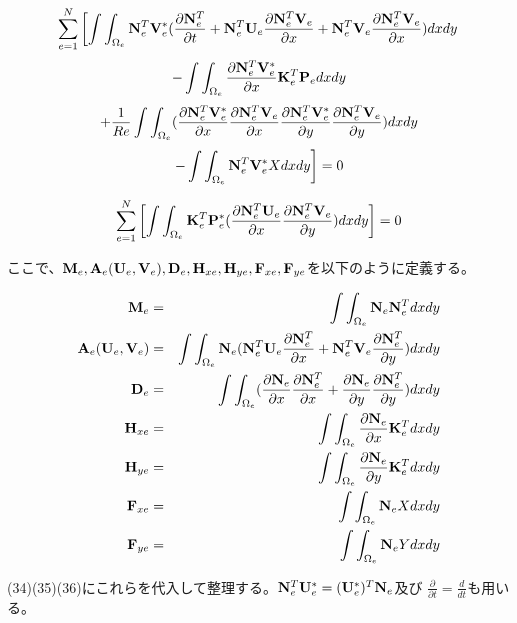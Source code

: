 \documentclass{jarticle}
\begin{document}
\[
\sum_{e=1}^N\left[ \int\int_{\Omega_e}{\bf N}_e^T{\bf V}_e^*(\frac{\partial{\bf N}_e^T}{\partial t}
  + {\bf N}_e^T{\bf U}_e\frac{\partial {\bf N}_e^T{\bf V}_e}{\partial x}
  + {\bf N}_e^T{\bf V}_e\frac{\partial {\bf N}_e^T{\bf V}_e}{\partial x})dxdy
\right.\]\[
- \int\int_{\Omega_e}\frac{\partial {\bf N}_e^T{\bf V}_e^*}{\partial x}{\bf K}_e^T {\bf P}_e dxdy
\]\[
+\frac{1}{Re}\int\int_{\Omega_e}(
\frac{\partial {\bf N}_e^T{\bf V}_e^*}{\partial x}\frac{\partial {\bf N}_e^T{\bf V}_e}{\partial x}
\frac{\partial {\bf N}_e^T{\bf V}_e^*}{\partial y}\frac{\partial {\bf N}_e^T{\bf V}_e}{\partial y}
)dxdy
\]\begin{equation}
\left.-\int\int_{\Omega_e}{\bf N}_e^T{\bf V}_e^* X dxdy \right] = 0
\end{equation}


\begin{equation}
  \sum_{e=1}^N\left[ \int\int_{\Omega_e}{\bf K}_e^T{\bf P}_e^*(
    \frac{\partial {\bf N}_e^T{\bf U}_e}{\partial x}
    \frac{\partial {\bf N}_e^T{\bf V}_e}{\partial y}
    )dxdy\right]=0
\end{equation}


ここで、${\bf M}_e, {\bf A}_e({\bf U}_e,{\bf V}_e), {\bf D}_e, {\bf H}_{xe}, {\bf H}_{ye}, {\bf F}_{xe}, {\bf F}_{ye}$を以下のように定義する。

\begin{eqnarray}
  {\bf M}_e&=&\int\int_{\Omega_e}{\bf N}_e{\bf N}_e^Tdxdy \\
  {\bf A}_e({\bf U}_e,{\bf V}_e) &=& \int\int_{\Omega_e}{\bf N}_e(
  {\bf N}_e^T{\bf U}_e\frac{\partial {\bf N}_e^T}{\partial x}
 + {\bf N}_e^T{\bf V}_e\frac{\partial {\bf N}_e^T}{\partial y}
  )dxdy\\
 {\bf D}_e&=&\int\int_{\Omega_e}(
 \frac{\partial{\bf N}_e}{\partial x}\frac{\partial{\bf N}_e^T}{\partial x}
+\frac{\partial{\bf N}_e}{\partial y}\frac{\partial{\bf N}_e^T}{\partial y}
 )dxdy\\
{\bf H}_{xe}&=&\int\int_{\Omega_e}\frac{\partial {\bf N}_e}{\partial x}{\bf K}_e^Tdxdy\\
{\bf H}_{ye}&=&\int\int_{\Omega_e}\frac{\partial {\bf N}_e}{\partial y}{\bf K}_e^Tdxdy\\
{\bf F}_{xe}&=&\int\int_{\Omega_e}{\bf N}_eXdxdy\\
{\bf F}_{ye}&=&\int\int_{\Omega_e}{\bf N}_eYdxdy
\end{eqnarray}

(34)(35)(36)にこれらを代入して整理する。${\bf N}_e^T{\bf U}_e^* = ({\bf U}_e^*)^T{\bf N}_e$及び
$\frac{\partial}{\partial t} = \frac{d}{dt}$も用いる。
\end{document}
